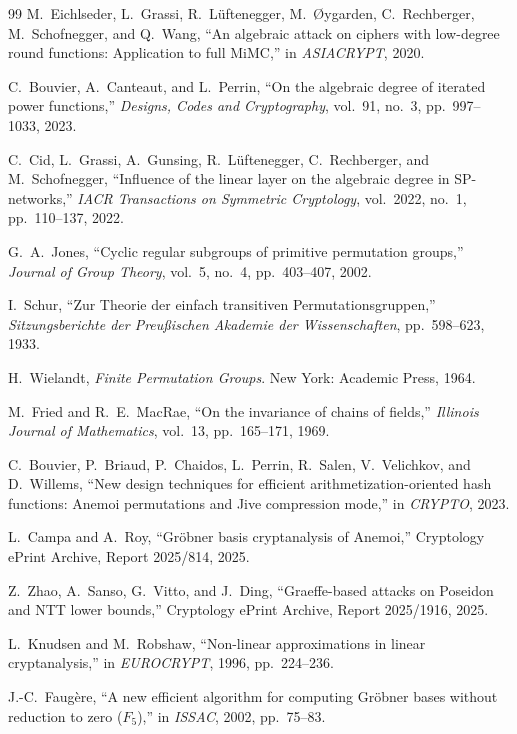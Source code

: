 \documentclass[11pt,a4paper]{article}
\theoremstyle{definition}
\begin{document}
\begin{thebibliography}{99}
M.~Eichlseder, L.~Grassi, R.~L\"uftenegger, M.~{\O}ygarden,
C.~Rechberger, M.~Schofnegger, and Q.~Wang,
``An algebraic attack on ciphers with low-degree round functions:
Application to full MiMC,''
in \emph{ASIACRYPT}, 2020.

C.~Bouvier, A.~Canteaut, and L.~Perrin,
``On the algebraic degree of iterated power functions,''
\emph{Designs, Codes and Cryptography}, vol.~91, no.~3,
pp.~997--1033, 2023.

C.~Cid, L.~Grassi, A.~Gunsing, R.~L\"uftenegger, C.~Rechberger, and
M.~Schofnegger,
``Influence of the linear layer on the algebraic degree in
SP-networks,''
\emph{IACR Transactions on Symmetric Cryptology}, vol.~2022, no.~1,
pp.~110--137, 2022.

G.~A.~Jones,
``Cyclic regular subgroups of primitive permutation groups,''
\emph{Journal of Group Theory}, vol.~5, no.~4, pp.~403--407, 2002.

I.~Schur,
``Zur Theorie der einfach transitiven Permutationsgruppen,''
\emph{Sitzungsberichte der Preu{\ss}ischen Akademie der
Wissenschaften}, pp.~598--623, 1933.

H.~Wielandt,
\emph{Finite Permutation Groups}.
New York: Academic Press, 1964.

M.~Fried and R.~E.~MacRae,
``On the invariance of chains of fields,''
\emph{Illinois Journal of Mathematics}, vol.~13, pp.~165--171, 1969.

C.~Bouvier, P.~Briaud, P.~Chaidos, L.~Perrin, R.~Salen, V.~Velichkov,
and D.~Willems,
``New design techniques for efficient arithmetization-oriented hash
functions: Anemoi permutations and Jive compression mode,''
in \emph{CRYPTO}, 2023.

L.~Campa and A.~Roy,
``Gr\"obner basis cryptanalysis of Anemoi,''
Cryptology ePrint Archive, Report 2025/814, 2025.

Z.~Zhao, A.~Sanso, G.~Vitto, and J.~Ding,
``Graeffe-based attacks on Poseidon and NTT lower bounds,''
Cryptology ePrint Archive, Report 2025/1916, 2025.

L.~Knudsen and M.~Robshaw,
``Non-linear approximations in linear cryptanalysis,''
in \emph{EUROCRYPT}, 1996, pp.~224--236.

J.-C.~Faug\`ere,
``A new efficient algorithm for computing Gr\"obner bases without reduction to zero ($F_5$),''
in \emph{ISSAC}, 2002, pp.~75--83.


\end{thebibliography}
\end{document}
